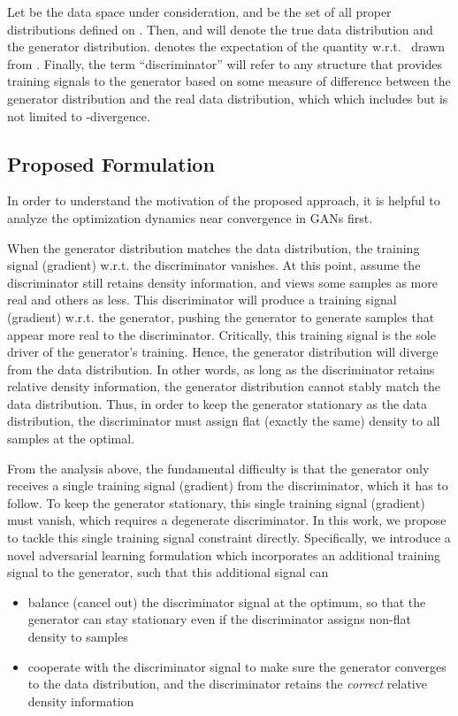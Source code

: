 \documentclass[a4paper]{article}
\begin{document}
Let  be the data space under consideration, and  be the set of all proper distributions defined on .
Then,  and  will denote the true data distribution and the generator distribution.
 denotes the expectation of the quantity  w.r.t.~ drawn from .
Finally, the term ``discriminator'' will refer to any structure that provides training signals to the generator based on some measure of difference between the generator distribution and the real data distribution, which which includes but is not limited to -divergence.

\subsection{Proposed Formulation}
In order to understand the motivation of the proposed approach, it is helpful to analyze the optimization dynamics near convergence in GANs first.

When the generator distribution matches the data distribution, 
the training signal (gradient) w.r.t. the discriminator vanishes.
At this point, assume the discriminator still retains density information, and views some samples as more real and others as less.
This discriminator will produce a training signal (gradient) w.r.t. the generator, pushing the generator to generate samples that appear more real to the discriminator.
Critically, this training signal is the sole driver of the generator's training. 
Hence, the generator distribution will diverge from the data distribution.
In other words, as long as the discriminator retains relative density information, the generator distribution cannot stably match the data distribution.
Thus, in order to keep the generator stationary as the data distribution, the discriminator must assign flat (exactly the same) density to all samples at the optimal. 

From the analysis above, the fundamental difficulty is that the generator only receives a single training signal (gradient) from the discriminator, which it has to follow.
To keep the generator stationary, this single training signal (gradient) must vanish, which requires a degenerate discriminator. In this work, we propose to tackle this single training signal constraint directly.
Specifically, we introduce a novel adversarial learning formulation which incorporates an additional training signal to the generator, such that this additional signal can 
\begin{itemize}
	\item balance (cancel out) the discriminator signal at the optimum, so that the generator can stay stationary even if the discriminator assigns non-flat density to samples
	\item cooperate with the discriminator signal to make sure the generator converges to the data distribution, and the discriminator retains the \textit{correct} relative density information 
\end{itemize} 
\end{document}
